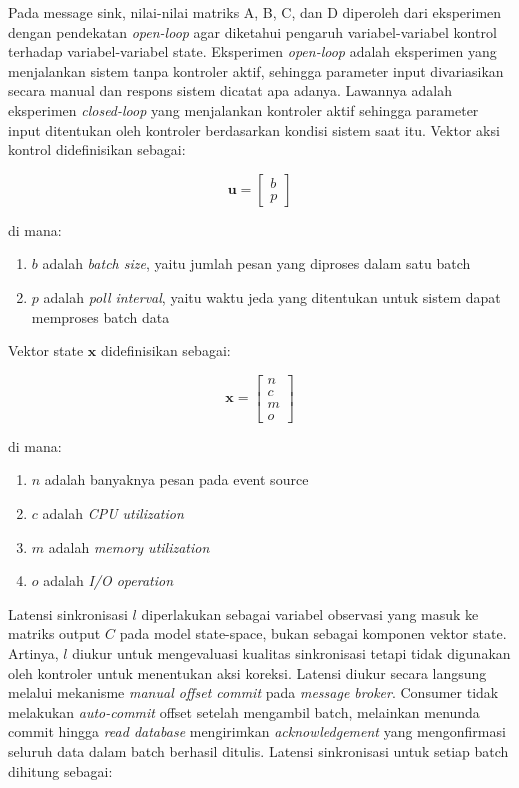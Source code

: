 Pada message sink, nilai-nilai matriks A, B, C, dan D diperoleh dari eksperimen dengan pendekatan \emph{open-loop} agar diketahui pengaruh variabel-variabel kontrol terhadap variabel-variabel state.
Eksperimen \emph{open-loop} adalah eksperimen yang menjalankan sistem tanpa kontroler aktif, sehingga parameter input divariasikan secara manual dan respons sistem dicatat apa adanya.
Lawannya adalah eksperimen \emph{closed-loop} yang menjalankan kontroler aktif sehingga parameter input ditentukan oleh kontroler berdasarkan kondisi sistem saat itu.
Vektor aksi kontrol didefinisikan sebagai:

\begin{equation}
\mathbf{u} = \begin{bmatrix} b \\ p \end{bmatrix}
\label{eq:vektor-kontrol}
\end{equation}

di mana:
\begin{enumerate}
\item $b$ adalah \emph{batch size}, yaitu jumlah pesan yang diproses dalam satu batch
\item $p$ adalah \emph{poll interval}, yaitu waktu jeda yang ditentukan untuk sistem dapat memproses batch data
\end{enumerate}

Vektor state $\mathbf{x}$ didefinisikan sebagai:

\begin{equation}
\mathbf{x} = \begin{bmatrix} n \\ c \\ m \\ o \end{bmatrix}
\label{eq:vektor-state}
\end{equation}

di mana:
\begin{enumerate}
\item $n$ adalah banyaknya pesan pada event source
\item $c$ adalah \emph{CPU utilization}
\item $m$ adalah \emph{memory utilization}
\item $o$ adalah \emph{I/O operation}
\end{enumerate}

Latensi sinkronisasi $l$ diperlakukan sebagai variabel observasi yang masuk ke matriks
output $C$ pada model state-space, bukan sebagai komponen vektor state.
Artinya, $l$ diukur untuk mengevaluasi kualitas sinkronisasi tetapi tidak digunakan oleh
kontroler untuk menentukan aksi koreksi.
Latensi diukur secara langsung melalui mekanisme \emph{manual offset commit} pada
\emph{message broker}.
Consumer tidak melakukan \emph{auto-commit} offset setelah mengambil batch, melainkan menunda
commit hingga \emph{read database} mengirimkan \emph{acknowledgement} yang mengonfirmasi
seluruh data dalam batch berhasil ditulis.
Latensi sinkronisasi untuk setiap batch dihitung sebagai:

